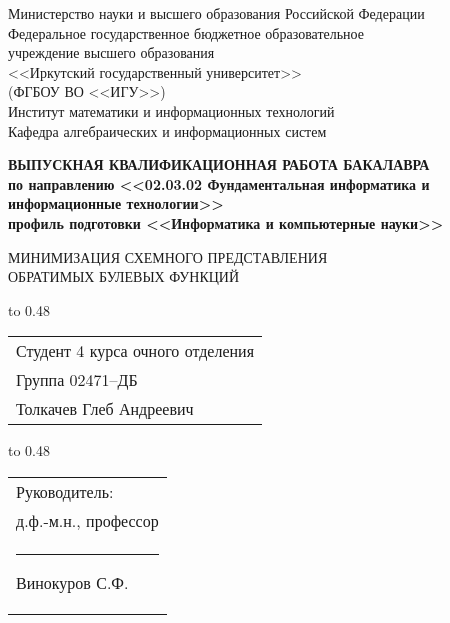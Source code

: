 \thispagestyle{empty}
\begin{center}
Министерство науки и высшего образования Российской Федерации\\
Федеральное государственное бюджетное образовательное\\
учреждение высшего образования\\
<<Иркутский государственный университет>>\\
(ФГБОУ ВО <<ИГУ>>)\\
Институт математики и информационных технологий\\
Кафедра алгебраических и информационных систем\\
\end{center}

\vspace{2.7cm}

\begin{center}
{\bf 
ВЫПУСКНАЯ КВАЛИФИКАЦИОННАЯ РАБОТА
БАКАЛАВРА\\[1mm]
по направлению <<02.03.02 Фундаментальная информатика и \\[1mm]
информационные технологии>>\\[1mm]
профиль подготовки <<Информатика и компьютерные науки>>
}  

\vspace{0.9cm}

{
МИНИМИЗАЦИЯ СХЕМНОГО ПРЕДСТАВЛЕНИЯ\\[1mm] ОБРАТИМЫХ БУЛЕВЫХ ФУНКЦИЙ
} %
\end{center}

\vspace{1.8cm}

{
\noindent\hbox to 0.48\textwidth {%
	\mbox{ } \hfil} %
	\begin{tabular}[t]{l}
		Студент 4 курса очного отделения\\
		Группа 02471--ДБ\\
		Толкачев Глеб 
		Андреевич		
	\end{tabular}		
}

\vspace{0.8cm}

{
\noindent\hbox to 0.48\textwidth {%
	\mbox{ } \hfil} %
	\begin{tabular}[t]{l}
			Руководитель:\\ д.ф.-м.н., профессор\\
		\rule{2.7cm}{0.5pt} Винокуров С.Ф.		
	\end{tabular}		
}

